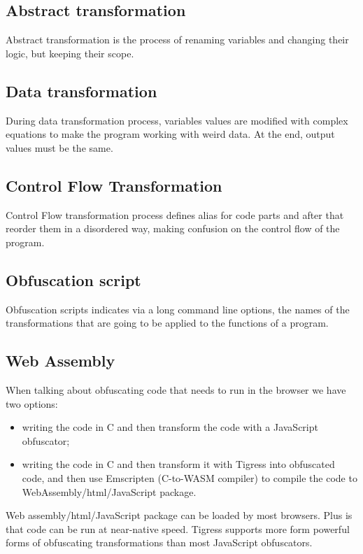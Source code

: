 \subsection{Abstract transformation}

Abstract transformation is the process of renaming variables and changing their logic, but keeping their scope.

\subsection{Data transformation}
During data transformation process, variables values are modified with complex equations to make the program working with weird data. At the end, output values must be the same.

\subsection{Control Flow Transformation}

Control Flow transformation process defines alias for code parts and after that reorder them in a disordered way, making confusion on the control flow of the program. 

\subsection{Obfuscation script}

Obfuscation scripts indicates via a long command line options, the names of the transformations that are going to be applied to the functions of a program. 

\subsection{Web Assembly}

When talking about obfuscating code that needs to run in the browser we have two options:
\begin{itemize}
    \item writing the code in C and then transform the code with a JavaScript obfuscator;
    \item writing the code in C and then transform it with Tigress into obfuscated code, and then use Emscripten (C-to-WASM compiler) to compile the code to WebAssembly/html/JavaScript package.   
\end{itemize}

Web assembly/html/JavaScript package can be loaded by most browsers. Plus is that code can be run at near-native speed. Tigress supports more form powerful forms of obfuscating transformations than most JavaScript obfuscators. 

